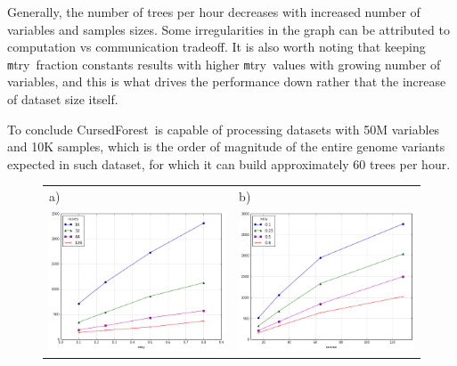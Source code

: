 \documentclass[10pt,letterpaper]{article}
\newcommand{\cursedforest}{{\sc CursedForest}}
\newcommand{\mtry}{{\texttt mtry}}
\begin{document}
Generally, the number of trees per hour decreases with increased number of variables and samples sizes. Some
irregularities in the graph can be attributed to computation vs communication tradeoff. It is also worth noting that
keeping \mtry\ fraction constants results with higher \mtry\ values with growing number of variables, and this is what
drives the performance down rather that the increase of dataset size itself.

To conclude \cursedforest\ is capable of processing datasets with 50M variables and 10K samples, which is the order of
magnitude of the entire genome variants expected in such dataset, for which it can build approximately 60 trees per
hour.

\begin{figure}[tbhp]
\begin{adjustwidth}{-1.00in}{0in}
\begin{tabular}{ll}
a)& b)\\
\includegraphics[totalheight=6cm]{./figs/mtry_cpu.png} & 
\includegraphics[totalheight=6cm]{./figs/cpu_mtry_trees_per_hour.png} \\

\end{tabular}
\end{adjustwidth}
\end{figure}
\end{document}
